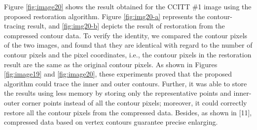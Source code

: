 


Figure  \ref{fig:image20} shows the result obtained for the CCITT \#1 image using the proposed restoration algorithm. Figure \ref{fig:img20-a} represents the contour-tracing result, and \ref{fig:img20-b} depicts the result of restoration from the compressed contour data. To verify the identity, we compared the contour pixels of the two images, and found that they are identical with regard to the number of contour pixels and the pixel coordinates, i.e., the contour pixels in the restoration result are the same as the original contour pixels. As shown in Figures \ref{fig:image19} and \ref{fig:image20}, these experiments proved that the proposed algorithm could trace the inner and outer contours. Further, it was able to store the results using less memory by storing only the representative points and inner-outer corner points instead of all the contour pixels; moreover, it could correctly restore all the contour pixels from the compressed data. Besides, as shown in [11], compressed data based on vertex contours guarantee precise enlarging.

